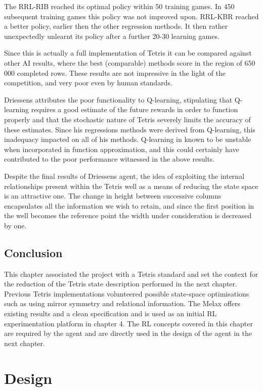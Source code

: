 \documentclass{rucsthesis}
\begin{document}
The RRL-RIB reached its optimal policy within 50 training games. In 450 subsequent training games this policy was not improved upon. RRL-KBR reached a better policy, earlier then the other regression methods. It then rather unexpectedly unlearnt its policy after a further 20-30 learning games.

Since this is actually a full implementation of Tetris it can be compared against other AI results, where the best (comparable) methods score in the region of 650 000 completed rows\citep{tetstand}. These results are not impressive in the light of the competition, and very poor even by human standards. 

Driessens attributes the poor functionality to Q-learning, stipulating that Q-learning requires a good estimate of the future rewards in order to function properly and that the stochastic nature of Tetris severely limits the accuracy of these estimates. Since his regressions methods were derived from Q-learning, this inadequacy impacted on all of his methods. Q-learning in known to be unstable\citep[pg. 4]{keepaway,thrun93issues} when incorporated in function approximation, and this could certainly have contributed to the poor performance witnessed in the above results.

Despite the final results of Driessens agent, the idea of exploiting the internal relationships present within the Tetris well as a means of reducing the state space is an attractive one. The change in height between successive columns encapsulates all the information we wish to retain, and since the first position in the well becomes the reference point the width under consideration is decreased by one.

\section{Conclusion}

This chapter associated the project with a Tetris standard and set the context for the reduction of the Tetris state description  performed in the next chapter. Previous Tetris implementations volunteered possible state-space optimisations such as using mirror symmetry and relational information. The Melax offers existing results and a clean specification and is used as an initial RL experimentation platform in chapter 4. The RL concepts covered in this chapter are required by the agent and are directly used in the design of the agent in the next chapter.

\chapter{Design}
\end{document}
